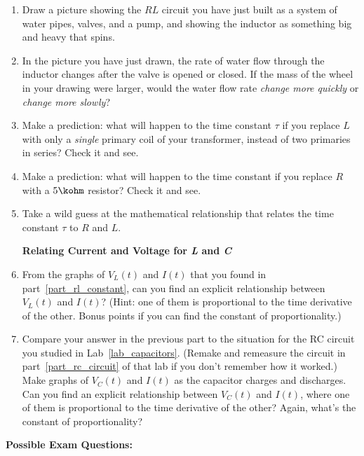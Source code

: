 \begin{enumerate}[wide]
\item Draw a picture showing the $RL$ circuit you have just built as a system of water pipes, valves, and a pump, and showing the inductor as something big and heavy that spins.  

\item In the picture you have just drawn, the rate of water flow through the inductor changes after the valve is opened or closed.
If the mass of the wheel in your drawing were larger, would the water flow rate \textit{change more quickly} or \textit{change more slowly}?

\item Make a prediction: what will happen to the time constant $\tau$ if you replace $L$ with only a \textit{single} primary coil of your transformer, instead of two primaries in series?  Check it and see.    

\item Make a prediction: what will happen to the time constant if you replace $R$ with a $5\kohm$ resistor?  Check it and see.

\item Take a wild guess at the mathematical relationship that relates the time constant $\tau$ to $R$ and $L$.

\textbf{Relating Current and Voltage for \textit{L} and \textit{C}}

\item From the graphs of $V_{L}(t)$ and $I(t)$ that you found in part~\ref{part_rl_constant}, can you find an explicit relationship between  $V_{L}(t)$ and $I(t)$?  (Hint: one of them is proportional to the time derivative of the other.  Bonus points if you can find the constant of proportionality.)

\item Compare your answer in the previous part to the situation for the RC circuit you studied in Lab~\ref{lab_capacitors}.  (Remake and remeasure the circuit in part~\ref{part_rc_circuit} of that lab if you don't remember how it worked.)  Make graphs of $V_{C}(t)$ and $I(t)$ as the capacitor charges and discharges.  Can you find an explicit relationship between $V_{C}(t)$ and $I(t)$, where one of them is proportional to the time derivative of the other?  Again, what's the constant of proportionality?

\vfill
\end{enumerate}

\textbf{Possible Exam Questions:}

